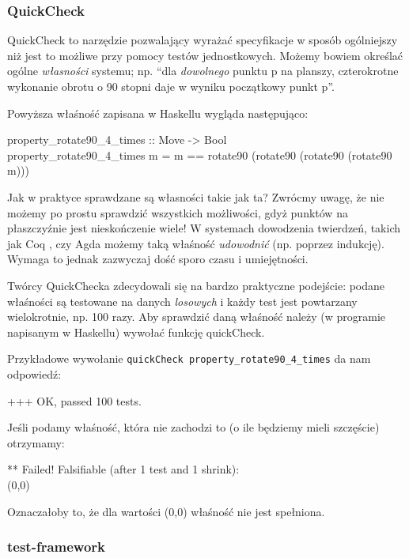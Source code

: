 \documentclass[10pt,leqno]{article}
\newcommand{\cmd}[1]{
  \texttt{#1}
}
\begin{document}
\subsubsection{QuickCheck}

QuickCheck to narzędzie pozwalający wyrażać specyfikacje w sposób ogólniejszy niż 
jest to możliwe przy pomocy testów jednostkowych. Możemy bowiem określać ogólne 
\emph{własności} systemu; np. ``dla \emph{dowolnego} punktu p na planszy, czterokrotne
wykonanie obrotu o 90 stopni daje w wyniku początkowy punkt p''.

Powyższa właśność zapisana w Haskellu wygląda następująco:

\begin{framed}
\noindent property\_rotate90\_4\_times :: Move -> Bool \\
property\_rotate90\_4\_times m = m == rotate90 (rotate90 (rotate90 (rotate90 m))) 
\end{framed}

Jak w praktyce sprawdzane są własności takie jak ta? Zwrócmy uwagę, że nie możemy po
prostu sprawdzić wszystkich możliwości, gdyż punktów na płaszczyźnie jest nieskończenie
wiele! W systemach dowodzenia twierdzeń, takich jak Coq \cite{coq}, czy Agda \cite{agda}
możemy taką właśność \emph{udowodnić} (np. poprzez indukcję). Wymaga to jednak zazwyczaj
dość sporo czasu i umiejętności. 

Twórcy QuickChecka zdecydowali się na bardzo praktyczne podejście: podane właśności są
testowane na danych \emph{losowych} i każdy test jest powtarzany wielokrotnie, np. 100 razy.
Aby sprawdzić daną właśność należy (w programie napisanym w Haskellu) wywołać funkcję quickCheck.

Przykładowe wywołanie \cmd{quickCheck property\_rotate90\_4\_times} da nam odpowiedź:

\begin{framed}
\noindent +++ OK, passed 100 tests.
\end{framed}

Jeśli podamy właśność, która nie zachodzi to (o ile będziemy mieli szczęście) otrzymamy:

\begin{framed}
\noindent *** Failed! Falsifiable (after 1 test and 1 shrink):  \\
(0,0)
\end{framed}

Oznaczałoby to, że dla wartości (0,0) właśność nie jest spełniona.

\subsubsection{test-framework}
\end{document}
